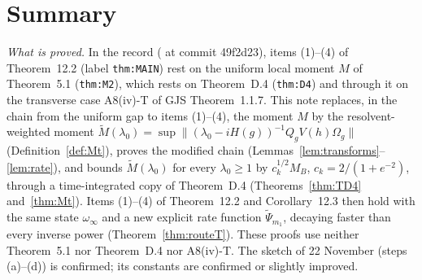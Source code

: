 \documentclass[11pt,a4paper]{article}
\newcommand{\Om}{\Omega}
\newcommand{\Mt}{\widetilde M}                %
\newcommand{\Psit}{\widetilde\Psi}
\theoremstyle{plain}
\theoremstyle{definition}
\begin{document}
\section*{Summary}

\emph{What is proved.}  In the record ( at commit 49f2d23), items
(1)--(4) of Theorem~12.2 (label \texttt{thm:MAIN}) rest on the uniform local moment $M$ of
Theorem~5.1 (\texttt{thm:M2}), which rests on Theorem~D.4 (\texttt{thm:D4}) and through it on the
transverse case A8(iv)-T of GJS Theorem~1.1.7.  This note replaces, in the chain from the
uniform gap to items (1)--(4), the moment $M$ by the resolvent-weighted moment
$\Mt(\lambda_0)=\sup\|(\lambda_0-iH(g))^{-1}Q_gV(h)\Om_g\|$ (Definition~\ref{def:Mt}), proves
the modified chain (Lemmas~\ref{lem:transforms}--\ref{lem:rate}), and bounds $\Mt(\lambda_0)$
for every $\lambda_0\ge1$ by $c_k^{1/2}M_B$, $c_k=2/(1+e^{-2})$, through a time-integrated copy
of Theorem~D.4 (Theorems~\ref{thm:TD4} and~\ref{thm:Mt}).  Items (1)--(4) of Theorem~12.2 and
Corollary~12.3 then hold with the same state $\omega_\infty$ and a new explicit rate function
$\Psit_{m_1}$, decaying faster than every inverse power (Theorem~\ref{thm:routeT}).  These proofs
use neither Theorem~5.1 nor Theorem~D.4 nor A8(iv)-T.  The sketch of
22 November (steps (a)--(d)) is confirmed; its constants are confirmed or slightly improved.
\end{document}
